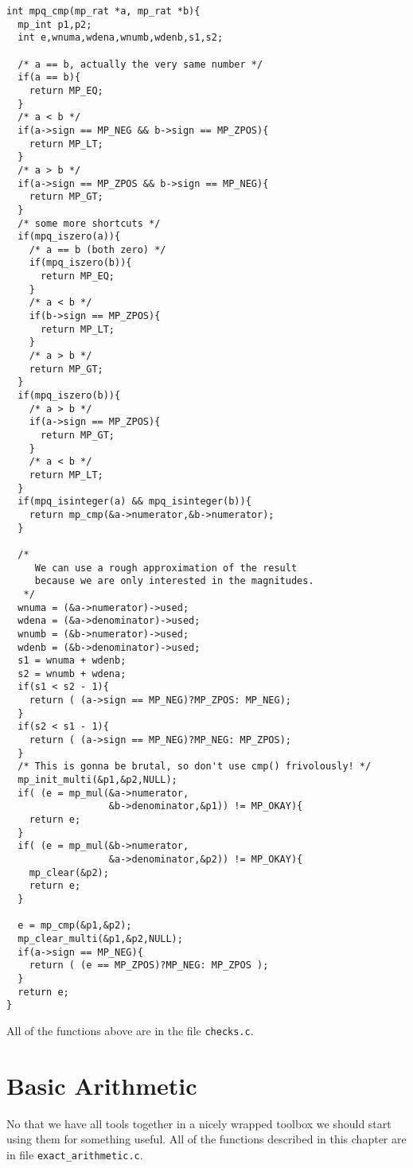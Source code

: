 \documentclass[10pt]{book}
\newcommand{\code}[1]{{\texttt{#1}}}
\theoremstyle{definition}
\theoremstyle{remark}
\begin{document}
 \begin{center}
    \begin{lstlisting}[caption={Compare Two rationals},label=comprats]
int mpq_cmp(mp_rat *a, mp_rat *b){
  mp_int p1,p2;
  int e,wnuma,wdena,wnumb,wdenb,s1,s2;

  /* a == b, actually the very same number */
  if(a == b){
    return MP_EQ;
  }
  /* a < b */
  if(a->sign == MP_NEG && b->sign == MP_ZPOS){
    return MP_LT;
  }
  /* a > b */
  if(a->sign == MP_ZPOS && b->sign == MP_NEG){
    return MP_GT;
  }
  /* some more shortcuts */
  if(mpq_iszero(a)){
    /* a == b (both zero) */
    if(mpq_iszero(b)){
      return MP_EQ;
    }
    /* a < b */
    if(b->sign == MP_ZPOS){
      return MP_LT;
    }
    /* a > b */
    return MP_GT;
  }
  if(mpq_iszero(b)){
    /* a > b */
    if(a->sign == MP_ZPOS){
      return MP_GT;
    }
    /* a < b */
    return MP_LT;
  }
  if(mpq_isinteger(a) && mpq_isinteger(b)){
    return mp_cmp(&a->numerator,&b->numerator);
  }

  /*
     We can use a rough approximation of the result
     because we are only interested in the magnitudes.
   */
  wnuma = (&a->numerator)->used;
  wdena = (&a->denominator)->used;
  wnumb = (&b->numerator)->used;
  wdenb = (&b->denominator)->used;
  s1 = wnuma + wdenb;
  s2 = wnumb + wdena;
  if(s1 < s2 - 1){
    return ( (a->sign == MP_NEG)?MP_ZPOS: MP_NEG);
  }
  if(s2 < s1 - 1){
    return ( (a->sign == MP_NEG)?MP_NEG: MP_ZPOS);
  }
  /* This is gonna be brutal, so don't use cmp() frivolously! */
  mp_init_multi(&p1,&p2,NULL);
  if( (e = mp_mul(&a->numerator,
                  &b->denominator,&p1)) != MP_OKAY){
    return e;
  }
  if( (e = mp_mul(&b->numerator,
                  &a->denominator,&p2)) != MP_OKAY){
    mp_clear(&p2);
    return e;
  }

  e = mp_cmp(&p1,&p2);
  mp_clear_multi(&p1,&p2,NULL);
  if(a->sign == MP_NEG){
    return ( (e == MP_ZPOS)?MP_NEG: MP_ZPOS );
  }
  return e;
}
    \end{lstlisting}
  \end{center}
All of the functions above are in the file \code{checks.c}.
\chapter{Basic Arithmetic}
No that we have all tools together in a nicely wrapped toolbox we should start
using them for something useful. All of the functions described in this chapter
are in file \code{exact\_arithmetic.c}.
\end{document}
